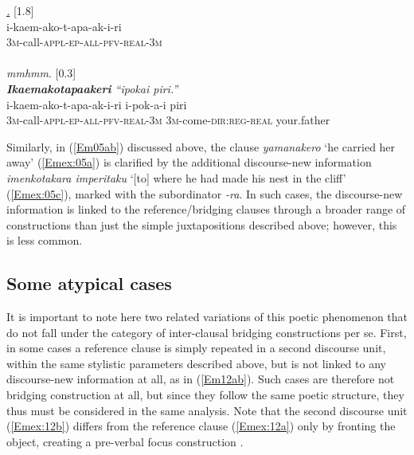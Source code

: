 \documentclass[output=paper]{LSP/langsci}
\begin{document}
\begin{exe}
\ex \label{Em11ac}
\begin{xlist}
\ex \label{Emex:11a}
\glt \textit{\underline{.} } [1.8]\\
\gll i-kaem-ako-t-apa-ak-i-ri\\
 \textsc{3m-}call\textsc{-appl-ep-all-pfv-real-3m}\\
\glt {}\\
\ex \label{Emex:11b}
\glt \textit{mmhmm}. [0.3]\\
\ex \label{Emex:11c}
\glt \textit{\textbf{Ikaemakotapaakeri} ``ipokai piri.''}\\
\gll i-kaem-ako-t-apa-ak-i-ri i-pok-a-i piri\\
   \textsc{3m-}call\textsc{-appl-ep-all-pfv-real-3m} \textsc{3m-}come\textsc{-dir:reg-real} your.father\\
\glt {}
\end{xlist}
\end{exe}
%
Similarly, in (\ref{Em05ab}) discussed above, the clause \textit{yamanakero} `he carried her away' (\ref{Emex:05a}) is clarified by the additional discourse-new information \textit{imenkotakara imperitaku} `[to] where he had made his nest in the cliff' (\ref{Emex:05c}), marked with the subordinator \textit{-ra}. In such cases, the discourse-new information is linked to the reference/bridging clauses through a broader range of constructions than just the simple juxtapositions described above; however, this is less common.
%
\subsection{Some atypical cases}
\label{Ematypical}
It is important to note here two related variations of this poetic phenomenon that do not fall under the category of inter-clausal bridging constructions per se. First, in some cases a reference clause is simply repeated in a second discourse unit, within the same stylistic parameters described above, but is not linked to any discourse-new information at all, as in (\ref{Em12ab}). Such cases are therefore not bridging construction at all, but since they follow the same poetic structure, they thus must be considered in the same analysis. Note that the second discourse unit (\ref{Emex:12b}) differs from the reference clause (\ref{Emex:12a}) only by fronting the object, creating a pre-verbal focus construction \citep[][385]{michael08}.
\end{document}
